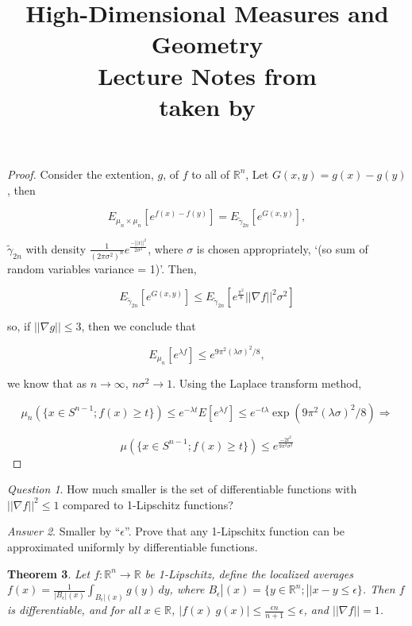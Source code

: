 \documentclass[12pt]{article}
\date{} %
\author{} %
\title{{\bf High-Dimensional Measures and Geometry}\\
Lecture Notes from \lecdat\\[0.1cm] \small taken by \notesby}
\newtheorem{thm}{Theorem}[section]
\theoremstyle{remark}
\newtheorem{question}[thm]{Question}
\newtheorem{answer}[thm]{Answer}
\newcommand{\reals}[0] { \mathbb{R}}
\newcommand{\rimply}[0] { \Rightarrow }
\newcommand{\rarw}[0] { \rightarrow }
\newcommand{ \Ex }[1] { E\left[ #1 \right ] }
\begin{document}
\maketitle


\begin{proof} 

Consider the extention, $g$, of $f$ to all of $\reals^n$, Let $G(x,y) = g(x) - g(y)$, then

$$
    E_{\mu_n \times \mu_n } \left[  e^{ f(x) - f(y) }   \right] = E_{ \tilde{\gamma}_{2n} } \left[  e^{G(x,y)}   \right],
$$

\noindent
$\tilde{\gamma}_{2n} $ with density $ \frac{1}{\left( 2 \pi \sigma^2 \right)^n} e^{\frac{-||x||^2}{2 \sigma^2}} $, where $\sigma$ is chosen appropriately, `(so sum of random variables variance = 1)'. Then,

$$
 E_{ \tilde{\gamma}_{2n}} \left[  e^{G(x,y)}  \right] \le E_{ \tilde{\gamma}_{2n} } \left[ e^{ \frac{ \pi^2} { 8 } } || \nabla f||^2 \sigma^2  \right]
$$

\noindent
so, if $|| \nabla g|| \le 3$, then we conclude that

$$
E_{\mu_n} \left[ e^{\lambda f} \right] \le e^{ 9 \pi^2 (\lambda \sigma ) ^2 / 8 },
$$
 
 \noindent
 we know that as $n \rarw \infty$, $n \sigma^2 \rarw 1$. Using the Laplace transform method,
 
 $$
 \mu_n \left( \{ x\in S^{n-1}; f(x) \ge t \}   \right) \le e^{-\lambda t} \Ex{ e^{\lambda f}} \le e^{- t \lambda } \exp( 9 \pi^2 (\lambda \sigma) ^2 /8) \rimply 
 $$

$$
 \mu \left( \{ x \in S^{n-1}; f(x) \ge t \} \right) \le e^{ \frac{-2t^2}{9 \pi^2 \sigma^2}}
$$
 
\end{proof}


\begin{question}
How much smaller is the set of differentiable functions with $|| \nabla f||^2 \le 1$ compared to 1-Lipschitz functions?
\end{question}

\begin{answer}
Smaller by ``$\epsilon$''. Prove that any 1-Lipschitx function can be approximated uniformly by differentiable functions.
\end{answer}

\begin{thm}
Let $f: \reals^n \rarw \reals$ be 1-Lipschitz, define the localized averages $f(x) = \frac{1}{|B_\epsilon|(x)} \int_{B_\epsilon|(x)} g(y) \, dy$, where $B_\epsilon|(x) = \{ y \in \reals^n; ||x-y \le \epsilon\}$. Then $f$ is differentiable, and for all $x \in \reals$, $|f(x) \ g(x)| \le \frac{ \epsilon n }{n+1} \le \epsilon$, and $|| \nabla f|| = 1$.

\end{thm}
\end{document}
